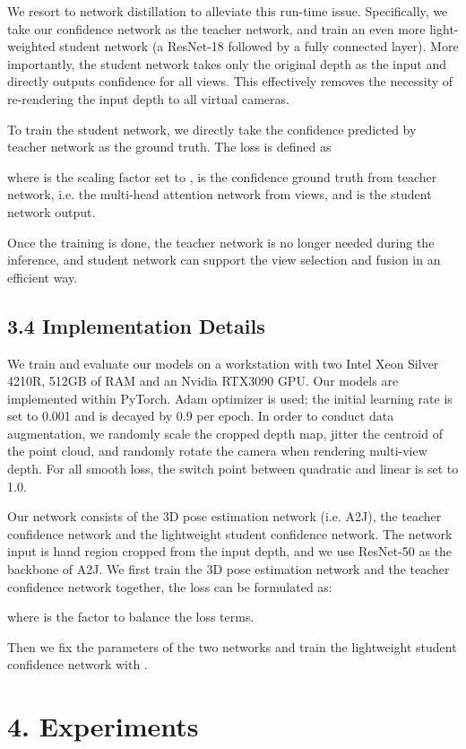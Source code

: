 \documentclass[letterpaper]{article} \usepackage{aaai22}  \usepackage{times}  \usepackage{helvet}  \usepackage{courier}  \usepackage[hyphens]{url}  \usepackage{graphicx} \urlstyle{rm} \def\UrlFont{\rm}  \usepackage{natbib}  \usepackage{caption} \DeclareCaptionStyle{ruled}{labelfont=normalfont,labelsep=colon,strut=off} \frenchspacing  \setlength{\pdfpagewidth}{8.5in}  \setlength{\pdfpageheight}{11in}  \usepackage{algorithm}
\begin{document}
We resort to network distillation to alleviate this run-time issue.
Specifically, we take our confidence network as the teacher network, and train an even more light-weighted student network (a ResNet-18 followed by a fully connected layer).
More importantly, the student network takes only the original depth as the input and directly outputs confidence for all  views.
This effectively removes the necessity of re-rendering the input depth to all virtual cameras.

To train the student network, we directly take the confidence predicted by teacher network as the ground truth.
The loss is defined as 

where  is the scaling factor set to ,  is the confidence ground truth from teacher network, i.e. the multi-head attention network from  views, and  is the student network output.

Once the training is done, the teacher network is no longer needed during the inference, and student network can support the view selection and fusion in an efficient way.

\subsection{3.4 Implementation Details}
We train and evaluate our models on a workstation with two Intel Xeon Silver 4210R, 512GB of RAM and an Nvidia RTX3090 GPU. Our models are implemented within PyTorch. Adam optimizer is used; the initial learning rate is set to 0.001 and is decayed by 0.9 per epoch.  In order to conduct data augmentation, we randomly scale the cropped depth map, jitter the centroid of the point cloud, and randomly rotate the camera when rendering multi-view depth. For all smooth loss, the switch point between quadratic and linear is set to 1.0.

Our network consists of the 3D pose estimation network (i.e. A2J), the teacher confidence network and the lightweight student confidence network. 
The network input is  hand region cropped from the input depth, and we use ResNet-50 as the backbone of A2J.
We first train the 3D pose estimation network and the teacher confidence network together, the loss can be formulated as:

where  is the factor to balance the loss terms.

Then we fix the parameters of the two networks and train the lightweight student confidence network with .

\section{4. Experiments}
\end{document}
